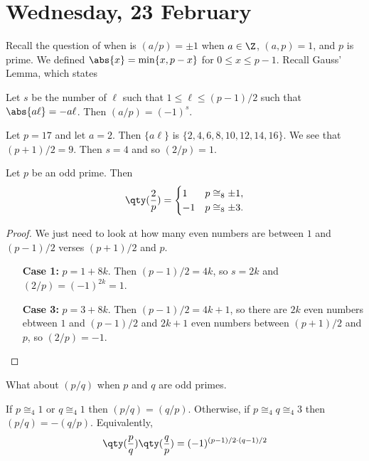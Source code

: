 
\section{Wednesday, 23 February}

Recall the question of when is $(a/p) = \pm1$ when $a\in\Z$, $(a,p) = 1$, and $p$ is prime. We defined $\abs{x} = \min\{x, p-x\}$ for $0 \leq x \leq p-1$. Recall Gauss' Lemma, which states

\begin{lemma}[Gauss]
Let $s$ be the number of $\ell$ such that $1 \leq \ell \leq (p-1)/2$ such that $\abs{a\ell} = -a\ell$. Then $(a/p) = (-1)^s$.
\end{lemma}

\begin{example}
Let $p = 17$ and let $a = 2$. Then $\{a\ell\}$ is $\{2, 4, 6, 8, 10, 12, 14, 16\}$. We see that $(p+1)/2 = 9$. Then $s=4$ and so $(2/p) = 1$.
\end{example}

\begin{theorem}
Let $p$ be an odd prime. Then 
\[
	\qty(\frac{2}{p}) = \begin{cases}
		1 & p \cong_8 \pm 1, \\
		-1 & p \cong_8 \pm 3.
	\end{cases}
\]
\end{theorem}

\begin{proof}
We just need to look at how many even numbers are between $1$ and $(p-1)/2$ verses $(p+1)/2$ and $p$.
\begin{enumerate}
\item[\textbf{Case 1:}] $p = 1 + 8k$. Then $(p-1)/2 = 4k$, so $s = 2k$ and $(2/p) = (-1)^{2k} = 1$.
\item[\textbf{Case 3:}] $p = 3 + 8k$. Then $(p-1)/2 = 4k + 1$, so there are $2k$ even numbers ebtween $1$ and $(p-1)/2$ and $2k+1$ even numbers between $(p+1)/2$ and $p$, so $(2/p) = -1$. \qedhere
\end{enumerate}
\end{proof}

What about $(p/q)$ when $p$ and $q$ are odd primes.

\begin{theorem}
If $p \cong_4 1$ or $q \cong_4 1$ then $(p/q) = (q/p)$. Otherwise, if $p \cong_4 q \cong_4 3$ then $(p/q) = -(q/p)$. Equivalently,
\[ \qty(\frac{p}{q})\qty(\frac{q}{p}) = (-1)^{(p-1)/2 \cdot (q-1)/2} \]
\end{theorem}

